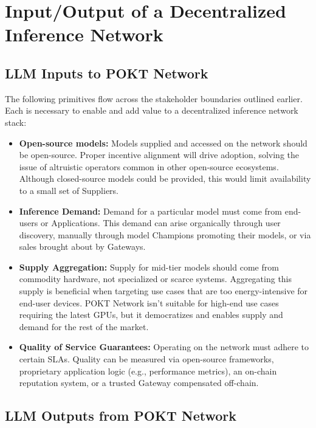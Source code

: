 \documentclass[conference,compsoc]{IEEEtran}
\begin{document}
\section{Input/Output of a Decentralized Inference Network}

\subsection{LLM Inputs to POKT Network}
The following primitives flow across the stakeholder boundaries outlined earlier. Each is necessary to enable and add value to a decentralized inference network stack:

\begin{itemize}
    \item \textbf{Open-source models:} Models supplied and accessed on the network should be open-source. Proper incentive alignment will drive adoption, solving the issue of altruistic operators common in other open-source ecosystems. Although closed-source models could be provided, this would limit availability to a small set of Suppliers.

    \item \textbf{Inference Demand:} Demand for a particular model must come from end-users or Applications. This demand can arise organically through user discovery, manually through model Champions promoting their models, or via sales brought about by Gateways.

    \item \textbf{Supply Aggregation:} Supply for mid-tier models should come from commodity hardware, not specialized or scarce systems. Aggregating this supply is beneficial when targeting use cases that are too energy-intensive for end-user devices. POKT Network isn't suitable for high-end use cases requiring the latest GPUs, but it democratizes and enables supply and demand for the rest of the market.

    \item \textbf{Quality of Service Guarantees:} Operating on the network must adhere to certain SLAs. Quality can be measured via open-source frameworks, proprietary application logic (e.g., performance metrics), an on-chain reputation system, or a trusted Gateway compensated off-chain.

\end{itemize}

\subsection{LLM Outputs from POKT Network}
\end{document}
